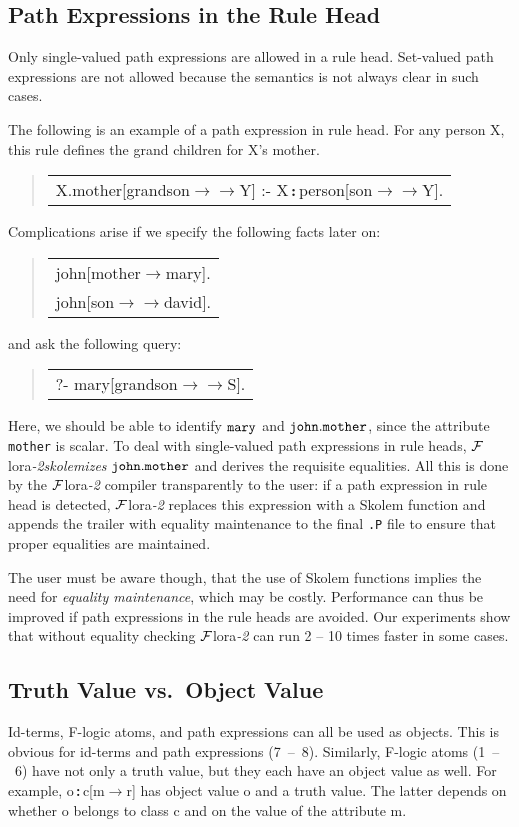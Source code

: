 \documentclass[11pt]{article}
\newenvironment{qrules}{\begin{quote}\sf\begin{tabular}[t]{l}}%
{\end{tabular}\end{quote}}
\newcommand{\isa}{\,{\bf{:}}\,}
\newcommand{\fd}{\ensuremath{{\rightarrow}}}                   %
\newcommand{\mvd}{\ensuremath{{\rightarrow\!\!\!\!\rightarrow}}}  %
\newcommand{\FLORA}{{\mbox{${\cal F}${\sc lora}\rm\emph{-2}}}\xspace}
\newcommand{\fl}{\mbox{F-logic}\xspace}
\begin{document}
\subsection{Path Expressions in the Rule Head}


Only single-valued path expressions are allowed in a rule head. Set-valued
path expressions are not allowed because the semantics is not always clear
in such cases.

The following is an example of a path expression in rule head. For any
person X, this rule defines the grand children for X's mother.
\begin{qrules}
X.mother[grandson{\mvd}Y] :- X{\isa}person[son{\mvd}Y].
\end{qrules}
Complications arise if we specify the following facts later on:
\begin{qrules}
john[mother{\fd}mary]. \\
john[son{\mvd}david].
\end{qrules}
and ask the following query:
\begin{qrules}
?- mary[grandson{\mvd}S].
\end{qrules}

Here, we should be able to identify ${\tt mary}$ and ${\tt john.mother}$,
since the attribute {\tt mother} is scalar. To deal with single-valued path
expressions in rule heads, \FLORA \emph{skolemizes} ${\tt john.mother}$ and
derives the requisite equalities.  All this is done by the
\FLORA compiler transparently to the user: if a path expression in rule head
is detected, \FLORA replaces this expression with a Skolem function and
appends the trailer with equality maintenance to the final {\tt .P} file
to ensure that proper equalities are maintained.

The user must be aware though, that the use of Skolem functions implies
the need for \emph{equality maintenance}, which may be costly.  Performance can
thus be improved if path expressions in the rule heads are avoided.  Our
experiments show that without equality checking \FLORA can run 2 -- 10 times
faster in some cases.


\subsection{Truth Value vs.\ Object Value}\label{sec-references}


Id-terms, \fl atoms, and path expressions can all be used 
as objects. This is obvious for id-terms and path
expressions (7~--~8). Similarly, \fl atoms (1~--~6) have not only a
truth value, but they each have an object value as well.
For example, {\sf o{\isa}c[m{\fd}r]} has object value {\sf o} and a truth value.
The latter depends on whether {\sf o} belongs to class {\sf c} and on the value of
the attribute {\sf m}.
\end{document}
